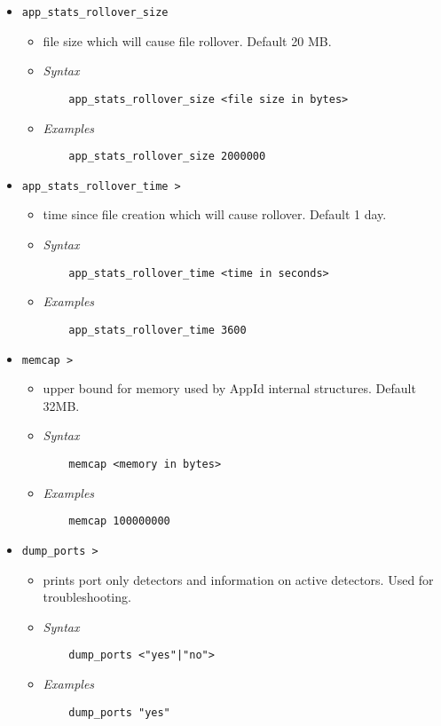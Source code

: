 \documentclass[english]{report}
\begin{document}
\begin{itemize}
\item[] \texttt{app\_stats\_rollover\_size}
\begin{itemize}
\item[]  file size which will cause file rollover. Default 20 MB.
\item[] \textit{Syntax}
\begin{verbatim}
    app_stats_rollover_size <file size in bytes>
\end{verbatim}
\item[] \textit{Examples}
\begin{verbatim}
    app_stats_rollover_size 2000000
\end{verbatim}
\end{itemize}

\item[] \texttt{app\_stats\_rollover\_time >}
\begin{itemize}
\item[]
      time since file creation which will cause rollover. Default 1 day.
\item[] \textit{Syntax}
\begin{verbatim}
    app_stats_rollover_time <time in seconds>
\end{verbatim}
\item[] \textit{Examples}
\begin{verbatim}
    app_stats_rollover_time 3600
\end{verbatim}
\end{itemize}

\item[] \texttt{memcap >}
\begin{itemize}
\item[]
      upper bound for memory used by AppId internal structures. Default 32MB.
\item[] \textit{Syntax}
\begin{verbatim}
    memcap <memory in bytes>
\end{verbatim}
\item[] \textit{Examples}
\begin{verbatim}
    memcap 100000000
\end{verbatim}
\end{itemize}

\item[] \texttt{dump\_ports >}
\begin{itemize}
\item[]
      prints port only detectors and information on active detectors. Used for troubleshooting.
\item[] \textit{Syntax}
\begin{verbatim}
    dump_ports <"yes"|"no">
\end{verbatim}
\item[] \textit{Examples}
\begin{verbatim}
    dump_ports "yes"
\end{verbatim}
\end{itemize}


\end{itemize}
\end{document}
